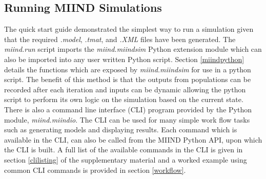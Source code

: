 \documentclass[utf8]{frontiersSCNS} %
\begin{document}
\subsection{Running MIIND Simulations}
The quick start guide demonstrated the simplest way to run a simulation given that the required \textit{.model}, \textit{.tmat}, and \textit{.XML} files have been generated. The \textit{miind.run} script imports the \textit{miind.miindsim} Python extension module which can also be imported into any user written Python script. Section \ref{miindpython} details the functions which are exposed by \textit{miind.miindsim} for use in a python script. The benefit of this method is that the outputs from populations can be recorded after each iteration and inputs can be dynamic allowing the python script to perform its own logic on the simulation based on the current state.\\
There is also a command line interface (CLI) program provided by the Python module, \textit{miind.miindio}. The CLI can be used for many simple work flow tasks such as generating models and displaying results. Each command which is available in the CLI, can also be called from the MIIND Python API, upon which the CLI is built. A full list of the available commands in the CLI is given in section \ref{clilisting} of the supplementary material and a worked example using common CLI commands is provided in section \ref{workflow}. \\  
\end{document}
